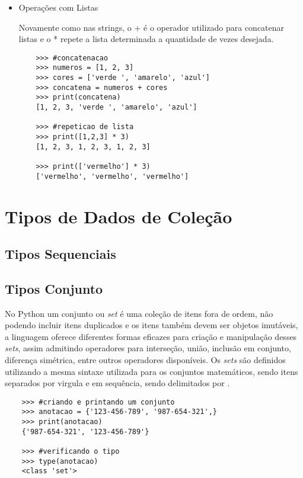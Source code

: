 	\begin{itemize}
	\item {Operações com Listas}
	
	Novamente como nas strings, o + é o operador utilizado para concatenar listas e o * repete a lista determinada a quantidade de vezes desejada.
	
	\begin{lstlisting}
	>>> #concatenacao
	>>> numeros = [1, 2, 3]
	>>> cores = ['verde ', 'amarelo', 'azul']
	>>> concatena = numeros + cores
	>>> print(concatena)
	[1, 2, 3, 'verde ', 'amarelo', 'azul']
	
	>>> #repeticao de lista
	>>> print([1,2,3] * 3)
	[1, 2, 3, 1, 2, 3, 1, 2, 3]
	
	>>> print(['vermelho'] * 3)
	['vermelho', 'vermelho', 'vermelho']
	\end{lstlisting}

	\end{itemize}
    \section{Tipos de Dados de Coleção}


            \subsection{Tipos Sequenciais}


            \subsection{Tipos Conjunto}
	No Python um conjunto ou \textit{set} é uma coleção de itens fora de ordem, não podendo incluir itens duplicados e os itens também devem ser objetos imutáveis, a linguagem oferece diferentes formas eficazes para criação e manipulação desses \textit{sets}, assim admitindo operadores para interseção, união, inclusão em conjunto, diferença simétrica, entre outros operadores disponíveis. Os \textit{sets} são definidos utilizando a mesma sintaxe utilizada para os conjuntos matemáticos, sendo itens separados por virgula e em sequência, sendo delimitados por {}.
	\begin{lstlisting}
	>>> #criando e printando um conjunto
	>>> anotacao = {'123-456-789', '987-654-321',}
	>>> print(anotacao)
	{'987-654-321', '123-456-789'}
		
	>>> #verificando o tipo
	>>> type(anotacao)
	<class 'set'>
	\end{lstlisting}
	
